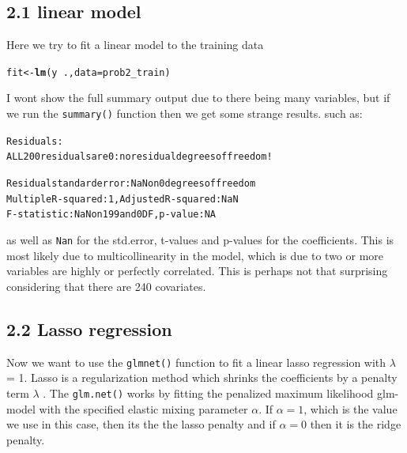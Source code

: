 \documentclass[11pt, a4paper, english]{article}\usepackage[]{graphicx}\usepackage[dvipsnames]{xcolor}
\makeatletter
\newcommand{\hlopt}[1]{\textcolor[rgb]{0,0,0}{#1}}%
\newcommand{\hlstd}[1]{\textcolor[rgb]{0.345,0.345,0.345}{#1}}%
\newcommand{\hlkwb}[1]{\textcolor[rgb]{0.69,0.353,0.396}{#1}}%
\newcommand{\hlkwc}[1]{\textcolor[rgb]{0.333,0.667,0.333}{#1}}%
\newcommand{\hlkwd}[1]{\textcolor[rgb]{0.737,0.353,0.396}{\textbf{#1}}}%
\newenvironment{kframe}{%
 \def\at@end@of@kframe{}%
 \ifinner\ifhmode%
  \def\at@end@of@kframe{\end{minipage}}%
  \begin{minipage}{\columnwidth}%
 \fi\fi%
 \def\FrameCommand##1{\hskip\@totalleftmargin \hskip-\fboxsep
 \colorbox{shadecolor}{##1}\hskip-\fboxsep
     \hskip-\linewidth \hskip-\@totalleftmargin \hskip\columnwidth}%
 \MakeFramed {\advance\hsize-\width
   \@totalleftmargin\z@ \linewidth\hsize
   \@setminipage}}%
 {\par\unskip\endMakeFramed%
 \at@end@of@kframe}
\newenvironment{knitrout}{}{} %
\makeatother
\begin{document}
\subsection{2.1 linear model}
Here we try to fit a linear model to the training data
\begin{knitrout}
\color{fgcolor}\begin{kframe}
\begin{alltt}
\hlstd{fit} \hlkwb{<-} \hlkwd{lm}\hlstd{( y} \hlopt{~} \hlstd{.,} \hlkwc{data}\hlstd{=prob2_train)}
\end{alltt}
\end{kframe}
\end{knitrout}
I wont show the full summary output due to there being many variables, but if we run the \texttt{summary()} function then we get some strange results. 
such as:
\begin{knitrout}
\color{fgcolor}\begin{kframe}
\begin{alltt}
Residuals:
ALL 200 residuals are 0: no residual degrees of freedom!

Residual standard error: NaN on 0 degrees of freedom
Multiple R-squared:      1,	Adjusted R-squared:    NaN 
F-statistic:   NaN on 199 and 0 DF,  p-value: NA
\end{alltt}
\end{kframe}
\end{knitrout}
as well as \texttt{Nan} for the std.error, t-values and p-values for the coefficients. This is most likely due to multicollinearity in the model, which is due to two or more variables are highly or perfectly correlated. This is perhaps not that surprising considering that there are 240 covariates. 

\subsection{2.2 Lasso regression}

Now we want to use the \texttt{glmnet()} function to fit a linear lasso regression with $\lambda$ = 1. 
Lasso is a regularization method which shrinks the coefficients by a penalty term $\lambda$ .
The  \texttt{glm.net()} works by fitting the penalized maximum likelihood glm-model with the specified elastic mixing parameter $\alpha$. If $\alpha=1$, which is the value we use in this case,  then its the the lasso penalty and if $\alpha = 0$ then it is the ridge penalty. 
\end{document}
